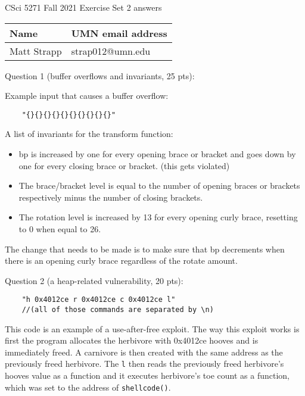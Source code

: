\documentclass[11pt]{article}
\begin{document}
\begin{center}
CSci 5271 Fall 2021 Exercise Set 2 answers 
\end{center}

\vspace{10pt}

\begin{tabular}{|p{2.6in}|p{2.6in}|}\hline
Name & UMN email address\\\hline
Matt Strapp & strap012@umn.edu \\\hline
\end{tabular}

\vspace{10pt}

Question 1 (buffer overflows and invariants, 25 pts):

Example input that causes a buffer overflow:
\begin{verbatim}
    "{}{}{}{}{}{}{}{}{}{}"
\end{verbatim}

A list of invariants for the transform function:
\begin{itemize}
    \item bp is increased by one for every opening brace or bracket and goes down by one for every closing brace or bracket. (this gets violated)
    \item The brace/bracket level is equal to the number of opening braces or brackets respectively minus the number of closing brackets.
    \item The rotation level is increased by 13 for every opening curly brace, resetting to 0 when equal to 26.
\end{itemize}
The change that needs to be made is to make sure that bp decrements when there is an opening curly brace regardless of the rotate amount.

\newpage

Question 2 (a heap-related vulnerability, 20 pts):
\begin{verbatim}
    "h 0x4012ce r 0x4012ce c 0x4012ce l" 
    //(all of those commands are separated by \n)
\end{verbatim}

This code is an example of a use-after-free exploit. The way this exploit works is first the program allocates the herbivore with 0x4012ce hooves and is immediately freed. A carnivore is then created with the same address as the previously freed herbivore. The \verb|l| then reads the previously freed herbivore's hooves value as a function and it executes herbivore's toe count as a function, which was set to the address of \verb|shellcode()|.
\newpage
\end{document}
